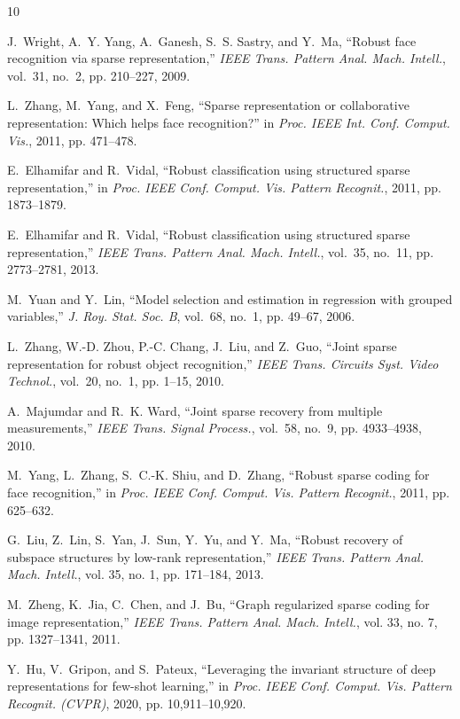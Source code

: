 \documentclass[10pt,comsoc]{IEEEtran}
\begin{document}
\begin{thebibliography}{10}

J.~Wright, A.~Y. Yang, A.~Ganesh, S.~S. Sastry, and Y.~Ma, ``Robust face recognition via sparse representation,'' \emph{IEEE Trans. Pattern Anal. Mach. Intell.}, vol.~31, no.~2, pp. 210--227, 2009.

L.~Zhang, M.~Yang, and X.~Feng, ``Sparse representation or collaborative representation: Which helps face recognition?'' in \emph{Proc. IEEE Int. Conf. Comput. Vis.}, 2011, pp. 471--478.

E.~Elhamifar and R.~Vidal, ``Robust classification using structured sparse representation,'' in \emph{Proc. IEEE Conf. Comput. Vis. Pattern Recognit.}, 2011, pp. 1873--1879.

E.~Elhamifar and R.~Vidal, ``Robust classification using structured sparse representation,'' \emph{IEEE Trans. Pattern Anal. Mach. Intell.}, vol.~35, no.~11, pp. 2773--2781, 2013.

M.~Yuan and Y.~Lin, ``Model selection and estimation in regression with grouped variables,'' \emph{J. Roy. Stat. Soc. B}, vol.~68, no.~1, pp. 49--67, 2006.

L.~Zhang, W.-D. Zhou, P.-C. Chang, J.~Liu, and Z.~Guo, ``Joint sparse representation for robust object recognition,'' \emph{IEEE Trans. Circuits Syst. Video Technol.}, vol.~20, no.~1, pp. 1--15, 2010.

A.~Majumdar and R.~K. Ward, ``Joint sparse recovery from multiple measurements,'' \emph{IEEE Trans. Signal Process.}, vol.~58, no.~9, pp. 4933--4938, 2010.

M.~Yang, L.~Zhang, S.~C.-K. Shiu, and D.~Zhang, ``Robust sparse coding for face recognition,'' in \emph{Proc. IEEE Conf. Comput. Vis. Pattern Recognit.}, 2011, pp. 625--632.

G.~Liu, Z.~Lin, S.~Yan, J.~Sun, Y.~Yu, and Y.~Ma, ``Robust recovery of subspace structures by low-rank representation,'' \emph{IEEE Trans. Pattern Anal. Mach. Intell.}, vol. 35, no. 1, pp. 171--184, 2013.

M.~Zheng, K.~Jia, C.~Chen, and J.~Bu, ``Graph regularized sparse coding for image representation,'' \emph{IEEE Trans. Pattern Anal. Mach. Intell.}, vol. 33, no. 7, pp. 1327--1341, 2011.

Y.~Hu, V.~Gripon, and S.~Pateux, ``Leveraging the invariant structure of deep representations for few-shot learning,'' in \emph{Proc. IEEE Conf. Comput. Vis. Pattern Recognit. (CVPR)}, 2020, pp. 10,911--10,920.


\end{thebibliography}
\end{document}
